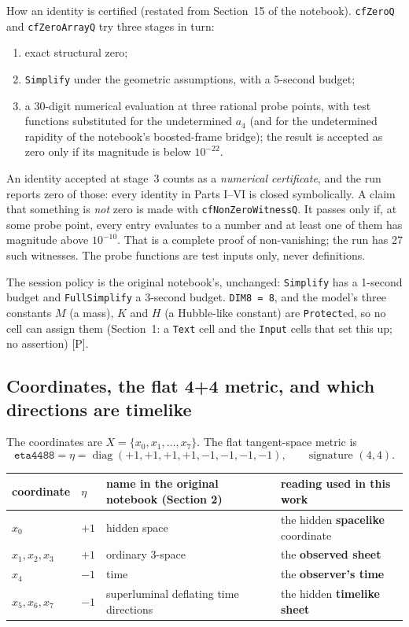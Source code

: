 How an identity is certified (restated from Section~15 of the notebook). \texttt{cfZeroQ} and
\texttt{cfZeroArrayQ} try three stages in turn:
\begin{enumerate}
  \item exact structural zero;
  \item \texttt{Simplify} under the geometric assumptions, with a 5-second budget;
  \item a 30-digit numerical evaluation at three rational probe points, with test functions
        substituted for the undetermined $a_4$ (and for the undetermined rapidity of the
        notebook's boosted-frame bridge); the result is accepted as zero only if its magnitude
        is below $10^{-22}$.
\end{enumerate}
An identity accepted at stage~3 counts as a \emph{numerical certificate}, and the run reports
zero of those: every identity in Parts I--VI is closed symbolically. A claim that something is
\emph{not} zero is made with \texttt{cfNonZeroWitnessQ}. It passes only if, at some probe point,
every entry evaluates to a number and at least one of them has magnitude above $10^{-10}$. That
is a complete proof of non-vanishing; the run has 27 such witnesses. The probe functions are
test inputs only, never definitions.

The session policy is the original notebook's, unchanged: \texttt{Simplify} has a 1-second budget
and \texttt{FullSimplify} a 3-second budget. \texttt{DIM8 = 8}, and the model's three constants
$M$ (a mass), $K$ and $H$ (a Hubble-like constant) are \texttt{Protect}ed, so no cell can assign
them (Section~1: a \texttt{Text} cell and the \texttt{Input} cells that set this up; no
assertion) [P].

\subsection{Coordinates, the flat 4+4 metric, and which directions are timelike}
\label{fnd:coords}\label{sec:2.2}

The coordinates are $X=\{x_0,x_1,\dots,x_7\}$. The flat tangent-space metric is
\begin{equation}
  \texttt{eta4488} = \eta = \operatorname{diag}(+1,+1,+1,+1,-1,-1,-1,-1),\qquad
  \text{signature }(4,4).
\end{equation}

\begin{center}
\small
\begin{tabular}{@{}llp{}p{}@{}}
\toprule
coordinate & $\eta$ & name in the original notebook (Section 2) & reading used in this work\\
\midrule
$x_0$ & $+1$ & hidden space & the hidden \textbf{spacelike} coordinate\\
$x_1,x_2,x_3$ & $+1$ & ordinary 3-space & the \textbf{observed sheet}\\
$x_4$ & $-1$ & time & the \textbf{observer's time}\\
$x_5,x_6,x_7$ & $-1$ & superluminal deflating time directions & the hidden \textbf{timelike sheet}\\
\bottomrule
\end{tabular}
\end{center}

